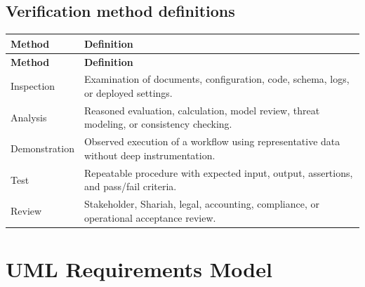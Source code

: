 \documentclass[11pt,a4paper]{article}
\begin{document}
\subsection{Verification method definitions}
\begin{footnotesize}
\begin{longtable}{@{}p{}p{}@{}}
\rowcolor{gray!18}\textbf{Method} & \textbf{Definition} \\ \hline
\endfirsthead
\rowcolor{gray!18}\textbf{Method} & \textbf{Definition} \\ \hline
\endhead
Inspection & Examination of documents, configuration, code, schema, logs, or deployed settings. \\ \hline
Analysis & Reasoned evaluation, calculation, model review, threat modeling, or consistency checking. \\ \hline
Demonstration & Observed execution of a workflow using representative data without deep instrumentation. \\ \hline
Test & Repeatable procedure with expected input, output, assertions, and pass/fail criteria. \\ \hline
Review & Stakeholder, Shariah, legal, accounting, compliance, or operational acceptance review. \\ \hline
\end{longtable}
\end{footnotesize}
\section{UML Requirements Model}
\end{document}
